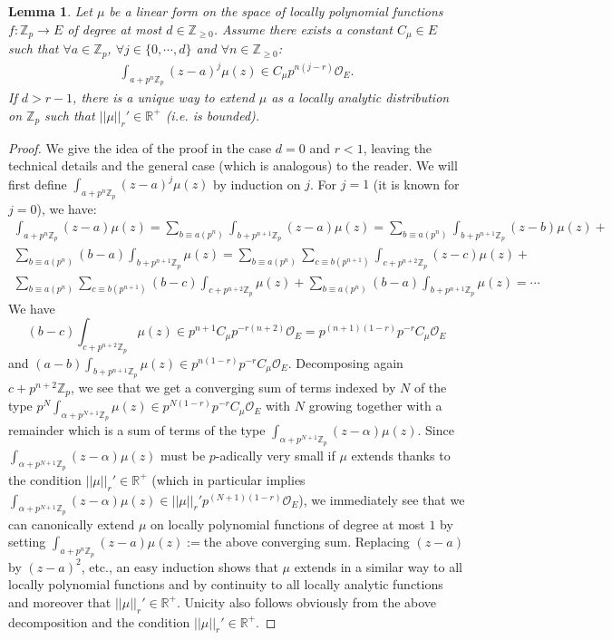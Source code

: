 \documentclass[11pt]{amsart}
\def\Z{{\mathbb Z}_p}
\def\O{{\mathcal O}_E}
\newtheorem{lem}[definit]{\bf{Lemma}}
\begin{document}
\begin{lem}\label{etendre} 
Let $\mu$ be a linear form on the space of locally polynomial
functions $f:\Z\rightarrow E$ of degree at most $d\in {\mathbb
  Z}_{\geq 0}$. Assume there exists a constant $C_{\mu}\in E$ such
that $\forall a\in \Z$, $\forall j\in \{0,\cdots,d\}$ and $\forall
n\in {\mathbb Z}_{\geq 0}$:  
\begin{eqnarray}\label{AMcondition}
\int_{a+p^n\Z}(z-a)^j\mu(z)\in C_{\mu}p^{n(j-r)}\O.
\end{eqnarray} 
If $d>r-1$, there is a unique way to extend $\mu$ as a locally
analytic distribution on $\Z$ such that $|\!|\mu|\!|_r'\in {\mathbb
  R}^+$ (i.e. is bounded).  
\end{lem} 
\begin{proof} 
We give the idea of the proof in the case $d=0$ and $r<1$, leaving the
technical details and the general case (which is analogous) to the
reader. We will first define $\int_{a+p^n\Z}(z-a)^j\mu(z)$ by
induction on $j$. For $j=1$ (it is known for $j=0$), we have:  
\begin{eqnarray*} 
\int_{a+p^n\Z}\!\!\!\!\!\!\!\!\!(z-a)\mu(z)=\sum_{b\equiv a(p^n)}
\int_{b+p^{n+1}\Z}\!\!\!\!\!\!\!\!\!(z-a)\mu(z)=\sum_{b\equiv
  a(p^n)}\int_{b+p^{n+1}\Z}\!\!\!\!\!\!\!\!\!(z-b)\mu(z)+\\  
\sum_{b\equiv a(p^n)}(b-a)\int_{b+p^{n+1}\Z}\!\!\!\!\!\mu(z)
=\sum_{b\equiv a(p^n)}\sum_{c\equiv b(p^{n+1})}
\int_{c+p^{n+2}\Z}\!\!\!\!\!\!\!\!\!(z-c)\mu(z)+\\ 
\sum_{b\equiv a(p^n)}\sum_{c\equiv b(p^{n+1})}(b-c)
\int_{c+p^{n+2}\Z}\!\!\!\!\!\!\mu(z)+\sum_{b\equiv a(p^n)}(b-a)
\int_{b+p^{n+1}\Z}\mu(z)=\cdots 
\end{eqnarray*} 
We have $$(b-c)\int_{c+p^{n+2}\Z}\mu(z)\in
p^{n+1}C_{\mu}p^{-r(n+2)}\O=p^{(n+1)(1-r)}p^{-r}C_{\mu}\O$$ and
$(a-b)\int_{b+p^{n+1}\Z}\!\!\mu(z)\in
p^{n(1-r)}p^{-r}C_{\mu}\O$. Decomposing again $c+p^{n+2}\Z$, we see
that we get a converging sum of terms indexed by $N$ of the type
$p^N\int_{\alpha+p^{N+1}\Z}\mu(z)\in p^{N(1-r)}p^{-r}C_{\mu}\O$ with
$N$ growing together with a remainder which is a sum of terms of the
type $\int_{\alpha+p^{N+1}\Z}(z-\alpha)\mu(z)$. Since
$\int_{\alpha+p^{N+1}\Z}(z-\alpha)\mu(z)$ must be $p$-adically very
small if $\mu$ extends thanks to the condition $|\!|\mu|\!|_r'\in
{\mathbb R}^+$ (which in particular implies
$\int_{\alpha+p^{N+1}\Z}(z-\alpha)\mu(z)\in
|\!|\mu|\!|_r'p^{(N+1)(1-r)}\O$), we immediately see that we can
canonically extend $\mu$ on locally polynomial functions of degree at
most $1$ by setting $\int_{a+p^n\Z}\!\!\!(z-a)\mu(z):=$the above
converging sum. Replacing $(z-a)$ by $(z-a)^2$, etc., an easy
induction shows that $\mu$ extends in a similar way to all locally
polynomial functions and by continuity to all locally analytic
functions and moreover that $|\!|\mu|\!|_r'\in {\mathbb R}^+$. Unicity
also follows obviously from the above decomposition and the condition
$|\!|\mu|\!|_r'\in {\mathbb R}^+$.  
\end{proof} 
 
\end{document}
